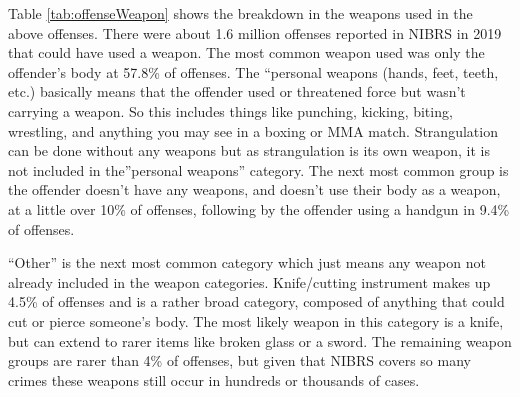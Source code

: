 \documentclass[
]{krantz}
\begin{document}
Table \ref{tab:offenseWeapon} shows the breakdown in the
weapons used in the above offenses. There were about 1.6
million offenses reported in NIBRS in 2019 that could have
used a weapon. The most common weapon used was only the
offender's body at 57.8\% of offenses. The ``personal
weapons (hands, feet, teeth, etc.) basically means that the
offender used or threatened force but wasn't carrying a
weapon. So this includes things like punching, kicking,
biting, wrestling, and anything you may see in a boxing or
MMA match. Strangulation can be done without any weapons but
as strangulation is its own weapon, it is not included in
the''personal weapons'' category. The next most common group
is the offender doesn't have any weapons, and doesn't use
their body as a weapon, at a little over 10\% of offenses,
following by the offender using a handgun in 9.4\% of
offenses.

``Other'' is the next most common category which just means
any weapon not already included in the weapon categories.
Knife/cutting instrument makes up 4.5\% of offenses and is a
rather broad category, composed of anything that could cut
or pierce someone's body. The most likely weapon in this
category is a knife, but can extend to rarer items like
broken glass or a sword. The remaining weapon groups are
rarer than 4\% of offenses, but given that NIBRS covers so
many crimes these weapons still occur in hundreds or
thousands of cases.
\end{document}
